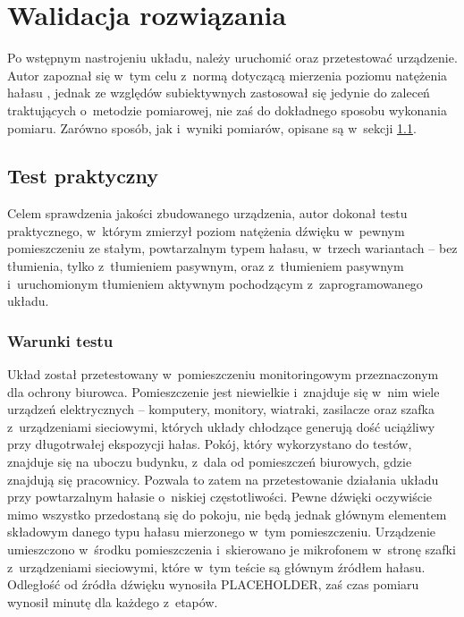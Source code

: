 \chapter{Walidacja rozwiązania}
\label{cha:tests}
Po wstępnym nastrojeniu układu, należy uruchomić oraz przetestować urządzenie. Autor zapoznał się w~tym celu z~normą dotyczącą mierzenia poziomu natężenia hałasu \cite{test_norm}, jednak ze względów subiektywnych zastosował się jedynie do zaleceń traktujących o~metodzie pomiarowej, nie zaś do dokładnego sposobu wykonania pomiaru. Zarówno sposób, jak i~wyniki pomiarów, opisane są w~sekcji \ref{sec:practical_test}.
\section{Test praktyczny}
\label{sec:practical_test}
Celem sprawdzenia jakości zbudowanego urządzenia, autor dokonał testu praktycznego, w~którym zmierzył poziom natężenia dźwięku w~pewnym pomieszczeniu ze stałym, powtarzalnym typem hałasu, w~trzech wariantach -- bez tłumienia, tylko z~tłumieniem pasywnym, oraz z~tłumieniem pasywnym i~uruchomionym tłumieniem aktywnym pochodzącym z~zaprogramowanego układu.
\subsection{Warunki testu}
\label{subsec:circumstances}
Układ został przetestowany w~pomieszczeniu monitoringowym przeznaczonym dla ochrony biurowca. Pomieszczenie jest niewielkie i~znajduje się w~nim wiele urządzeń elektrycznych -- komputery, monitory, wiatraki, zasilacze oraz szafka z~urządzeniami sieciowymi, których układy chłodzące generują dość uciążliwy przy długotrwałej ekspozycji hałas. Pokój, który wykorzystano do testów, znajduje się na uboczu budynku, z~dala od pomieszczeń biurowych, gdzie znajdują się pracownicy. Pozwala to zatem na przetestowanie działania układu przy powtarzalnym hałasie o~niskiej częstotliwości. Pewne dźwięki oczywiście mimo wszystko przedostaną się do pokoju, nie będą jednak głównym elementem składowym danego typu hałasu mierzonego w~tym pomieszczeniu. Urządzenie umieszczono w~środku pomieszczenia i~skierowano je mikrofonem w~stronę szafki z~urządzeniami sieciowymi, które w~tym teście są głównym źródłem hałasu. Odległość od źródła dźwięku wynosiła PLACEHOLDER, %
zaś czas pomiaru wynosił minutę dla każdego z~etapów.

